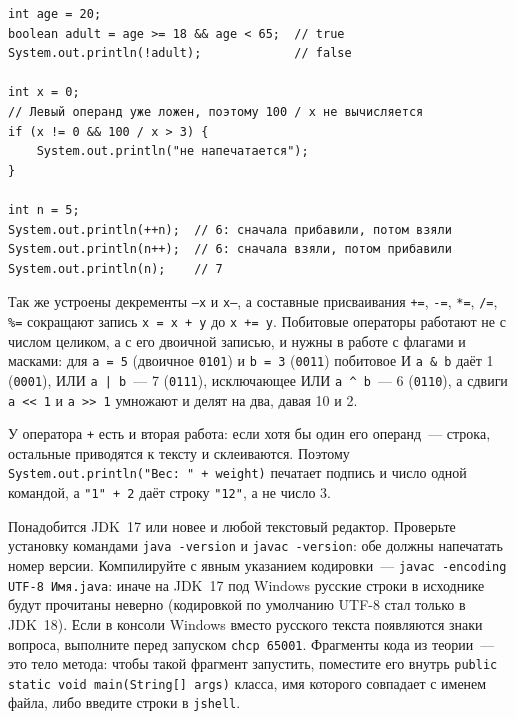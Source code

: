 \begin{listing}[H]
\begin{verbatim}
int age = 20;
boolean adult = age >= 18 && age < 65;  // true
System.out.println(!adult);             // false

int x = 0;
// Левый операнд уже ложен, поэтому 100 / x не вычисляется
if (x != 0 && 100 / x > 3) {
    System.out.println("не напечатается");
}

int n = 5;
System.out.println(++n);  // 6: сначала прибавили, потом взяли
System.out.println(n++);  // 6: сначала взяли, потом прибавили
System.out.println(n);    // 7
\end{verbatim}
\caption{Логические операторы, короткое замыкание и инкремент}
\label{lst:01-10}
\end{listing}

Так же устроены декременты \texttt{--x} и \texttt{x--}, а составные
присваивания \texttt{+=}, \texttt{-=}, \texttt{*=}, \texttt{/=}, \texttt{\%=}
сокращают запись \texttt{x = x + y} до \texttt{x += y}. Побитовые операторы
работают не с числом целиком, а с его двоичной записью, и нужны в работе с
флагами и масками: для \texttt{a = 5} (двоичное \texttt{0101}) и \texttt{b = 3}
(\texttt{0011}) побитовое И \texttt{a \& b} даёт 1 (\texttt{0001}), ИЛИ
\texttt{a | b}~--- 7 (\texttt{0111}), исключающее ИЛИ
\texttt{a \textasciicircum{} b}~--- 6 (\texttt{0110}), а сдвиги
\texttt{a << 1} и \texttt{a >> 1} умножают и делят на два, давая 10 и 2.

У оператора \texttt{+} есть и вторая работа: если хотя бы один его операнд~---
строка, остальные приводятся к тексту и склеиваются. Поэтому
\texttt{System.out.println("Вес: " + weight)} печатает подпись и число одной
командой, а \texttt{"1" + 2} даёт строку \texttt{"12"}, а не число 3.

\praktikum{}

Понадобится JDK~17 или новее и любой текстовый редактор. Проверьте установку
командами \texttt{java -version} и \texttt{javac -version}: обе должны
напечатать номер версии. Компилируйте с явным указанием кодировки~---
\texttt{javac~-encoding UTF-8 Имя.java}: иначе на JDK~17 под Windows русские
строки в исходнике будут прочитаны неверно (кодировкой по умолчанию UTF-8 стал
только в JDK~18). Если в консоли Windows вместо русского текста появляются знаки
вопроса, выполните перед запуском \texttt{chcp 65001}. Фрагменты кода из
теории~--- это тело метода: чтобы такой фрагмент запустить, поместите его внутрь
\texttt{public static void main(String[] args)} класса, имя которого совпадает с
именем файла, либо введите строки в \texttt{jshell}.


